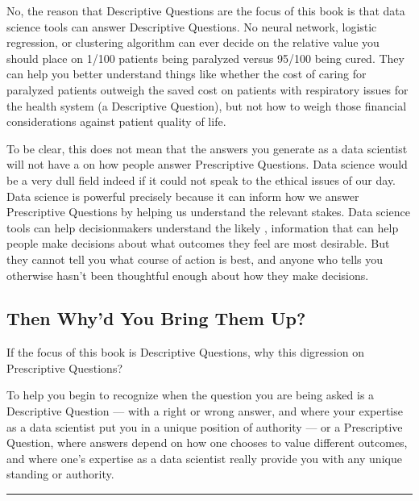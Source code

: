 \documentclass[letterpaper,10pt,english]{jupyterBook}
\begin{document}
\sphinxAtStartPar
No, the reason that Descriptive Questions are the focus of this book is that data science tools can  answer Descriptive Questions. No neural network, logistic regression, or clustering algorithm can ever decide on the relative value you should place on 1/100 patients being paralyzed versus 95/100 being cured. They can help you better understand things like whether the cost of caring for paralyzed patients outweigh the saved cost on patients with respiratory issues for the health system (a Descriptive Question), but not how to weigh those financial considerations against patient quality of life.

\sphinxAtStartPar
To be clear, this does not mean that the answers you generate as a data scientist will not have a  on how people answer Prescriptive Questions. Data science would be a very dull field indeed if it could not speak to the ethical issues of our day. Data science is powerful precisely because it can inform how we answer Prescriptive Questions by helping us understand the relevant stakes. Data science tools can help decision\sphinxhyphen{}makers understand the likely , information that can help people make  decisions about what outcomes they feel are most desirable. But they cannot tell you what course of action is best, and anyone who tells you otherwise hasn’t been thoughtful enough about how they make decisions.


\subsection{Then Why’d You Bring Them Up?}
\label{\detokenize{30_questions/05_descriptive_v_prescriptive:then-why-d-you-bring-them-up}}
\sphinxAtStartPar
If the focus of this book is Descriptive Questions, why this digression on Prescriptive Questions?

\sphinxAtStartPar
To help you begin to recognize when the question you are being asked is a Descriptive Question — with a right or wrong answer, and where your expertise as a data scientist put you in a unique position of authority — or a Prescriptive Question, where answers depend on how one chooses to value different outcomes, and where one’s expertise as a data scientist really  provide you with any unique standing or authority.


\bigskip\hrule\bigskip
\end{document}

